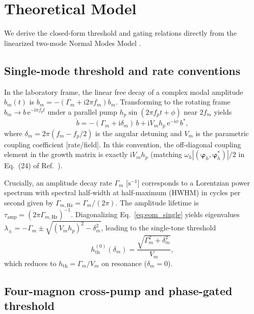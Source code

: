 \documentclass[aps,prb,reprint,superscriptaddress,floatfix]{revtex4-2}
\newcommand{\ii}{\mathrm{i}}
\newcommand{\ee}{\mathrm{e}}
\newcommand{\hth}{h_{\mathrm{th}}}
\begin{document}
\section{Theoretical Model}\label{sec:theory}

We derive the closed-form threshold and gating relations directly from the linearized two-mode Normal Modes Model \cite{daquino26,perna22}.

\subsection{Single-mode threshold and rate conventions}\label{sec:th_single}

In the laboratory frame, the linear free decay of a complex modal amplitude $b_m(t)$ is $\dot b_m = -(\Gamma_m + \ii 2\pi f_m)b_m$. Transforming to the rotating frame $b_m\to b\,\ee^{-\ii \pi f_p t}$ under a parallel pump $h_p\sin(2\pi f_p t + \phi)$ near $2f_m$ yields
\begin{equation}
\dot b = -(\Gamma_m + \ii\delta_m)\,b + \ii V_m h_p\,\ee^{-\ii\phi}\,b^*,
\label{eq:eom_single}
\end{equation}
where $\delta_m=2\pi(f_m-f_p/2)$ is the angular detuning and $V_m$ is the parametric coupling coefficient [rate/field]. In this convention, the off-diagonal coupling element in the growth matrix is exactly $\ii V_m h_p$ (matching $\omega_h|(\boldsymbol\varphi_h,\boldsymbol\varphi_h^*)|/2$ in Eq.~(24) of Ref.~\cite{daquino26}).

Crucially, an amplitude decay rate $\Gamma_m$ [$\si{\second^{-1}}$] corresponds to a Lorentzian power spectrum with spectral half-width at half-maximum (HWHM) in cycles per second given by $\Gamma_{m,\mathrm{Hz}}=\Gamma_m/(2\pi)$. The amplitude lifetime is $\tau_{\mathrm{amp}}=(2\pi\Gamma_{m,\mathrm{Hz}})^{-1}$. Diagonalizing Eq.~\eqref{eq:eom_single} yields eigenvalues $\lambda_\pm = -\Gamma_m \pm \sqrt{(V_m h_p)^2 - \delta_m^2}$, leading to the single-tone threshold
\begin{equation}
\hth^{(0)}(\delta_m) = \frac{\sqrt{\Gamma_m^2+\delta_m^2}}{V_m},
\label{eq:arnold_th}
\end{equation}
which reduces to $\hth=\Gamma_m/V_m$ on resonance ($\delta_m=0$).

\subsection{Four-magnon cross-pump and phase-gated threshold}\label{sec:th_twotone}
\end{document}

